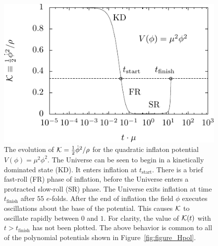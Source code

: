 %
\begin{figure}[ht]
  \includegraphics[width=\textwidth]{chapter_kinetic_dominance/figures/Kpol} 
  \caption{The evolution of $\mathcal{K} = \frac{1}{2}\dot{\phi}^2/\rho$ for the quadratic inflaton potential $V(\phi) = \mu^2 \phi^2$.  The Universe can be seen to begin in a kinetically dominated state (KD).  It enters inflation at $t_\mathrm{start}$. There is a brief fast-roll (FR) phase of inflation, before the Universe enters a protracted slow-roll (SR) phase. The Universe exits inflation at time $t_\mathrm{finish}$ after $55$ $e$-folds. After the end of inflation the field $\phi$ executes oscillations about the base of the potential. This causes $\mathcal{K}$ to oscillate rapidly between $0$ and $1$. For clarity, the value of $\mathcal{K}(t)$ with $t>t_\mathrm{finish}$ has not been plotted. The above behavior is common to all of the  polynomial potentials shown in Figure~\protect\ref{fig:figure_Hpol}.\label{fig:figure_Kpol}  }
\end{figure}
%

